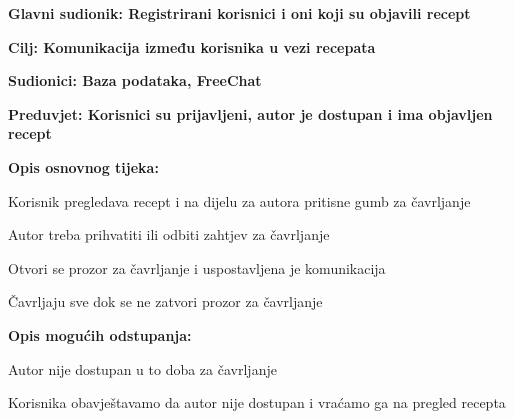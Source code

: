 	\noindent {}
	\begin{packed_item}
		
		\item  \textbf{Glavni sudionik: Registrirani korisnici i oni koji su objavili recept }
		\item  \textbf{Cilj: Komunikacija između korisnika u vezi recepata} 
		\item  \textbf{Sudionici: Baza podataka, FreeChat} 
		\item  \textbf{Preduvjet: Korisnici su prijavljeni, autor je dostupan i ima objavljen recept} 
		\item  \textbf{Opis osnovnog tijeka:}
		
		\item[] \begin{packed_enum}
			
			\item Korisnik pregledava recept i na dijelu za autora pritisne gumb za čavrljanje 
			\item Autor treba prihvatiti ili odbiti zahtjev za čavrljanje
			\item Otvori se prozor za čavrljanje i uspostavljena je komunikacija
			\item Čavrljaju sve dok se ne zatvori prozor za čavrljanje
		\end{packed_enum}
		
		\item  \textbf{Opis mogućih odstupanja:}
		
		\item[] \begin{packed_item}
			
			\item[2.a] Autor nije dostupan u to doba za čavrljanje
			\item[] \begin{packed_enum}
				
				\item Korisnika obavještavamo da autor nije dostupan i vraćamo ga na pregled recepta
				
			\end{packed_enum}
			
		\end{packed_item}
	\end{packed_item}
	
